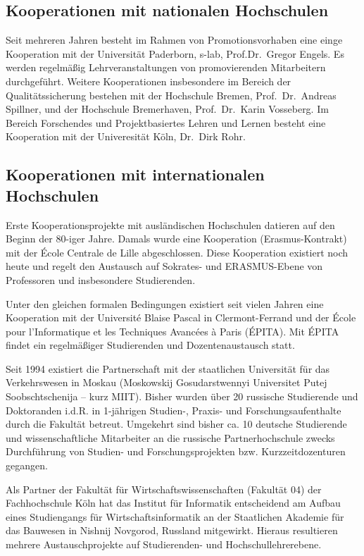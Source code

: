 \subsection{Kooperationen mit nationalen
Hochschulen}\label{kooperationen-mit-nationalen-hochschulen}

Seit mehreren Jahren besteht im Rahmen von Promotionsvorhaben eine einge
Kooperation mit der Universität Paderborn, s-lab, Prof.Dr.~Gregor
Engels. Es werden regelmäßig Lehrveranstaltungen von promovierenden
Mitarbeitern durchgeführt. Weitere Kooperationen insbesondere im Bereich
der Qualitätssicherung bestehen mit der Hochschule Bremen,
Prof.~Dr.~Andreas Spillner, und der Hochschule Bremerhaven,
Prof.~Dr.~Karin Vosseberg. Im Bereich Forschendes und Projektbasiertes
Lehren und Lernen besteht eine Kooperation mit der Univeresität Köln,
Dr.~Dirk Rohr.

\subsection{Kooperationen mit internationalen
Hochschulen}\label{kooperationen-mit-internationalen-hochschulen}

Erste Kooperationsprojekte mit ausländischen Hochschulen datieren auf
den Beginn der 80-iger Jahre. Damals wurde eine Kooperation
(Erasmus-Kontrakt) mit der École Centrale de Lille abgeschlossen. Diese
Kooperation existiert noch heute und regelt den Austausch auf Sokrates-
und ERASMUS-Ebene von Professoren und insbesondere Studierenden.

Unter den gleichen formalen Bedingungen existiert seit vielen Jahren
eine Kooperation mit der Université Blaise Pascal in Clermont-Ferrand
und der École pour l'Informatique et les Techniques Avancées à Paris
(ÉPITA). Mit ÉPITA findet ein regelmäßiger Studierenden und
Dozentenaustausch statt.

Seit 1994 existiert die Partnerschaft mit der staatlichen Universität
für das Verkehrswesen in Moskau (Moskowskij Gosudarstwennyi Universitet
Putej Soobschtschenija -- kurz MIIT). Bisher wurden über 20 russische
Studierende und Doktoranden i.d.R. in 1-jährigen Studien-, Praxis- und
Forschungsaufenthalte durch die Fakultät betreut. Umgekehrt sind bisher
ca. 10 deutsche Studierende und wissenschaftliche Mitarbeiter an die
russische Partnerhochschule zwecks Durchführung von Studien- und
Forschungsprojekten bzw. Kurzzeitdozenturen gegangen.

Als Partner der Fakultät für Wirtschaftswissenschaften (Fakultät 04) der
Fachhochschule Köln hat das Institut für Informatik entscheidend am
Aufbau eines Studiengangs für Wirtschaftsinformatik an der Staatlichen
Akademie für das Bauwesen in Nishnij Novgorod, Russland mitgewirkt.
Hieraus resultieren mehrere Austauschprojekte auf Studierenden- und
Hochschullehrerebene.

